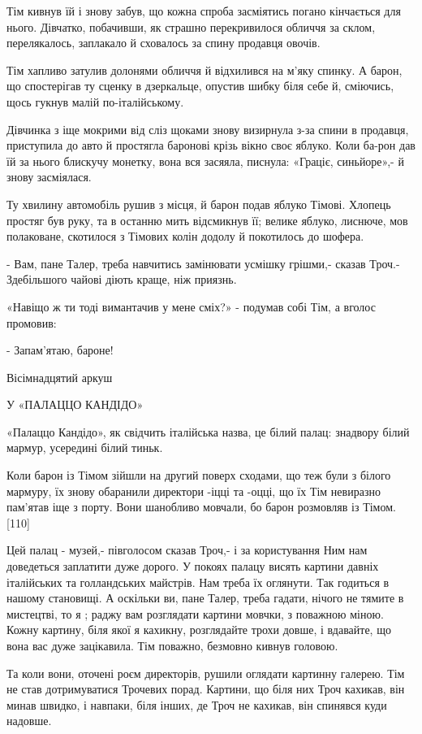 Тім кивнув їй і знову забув, що кожна спроба засміятись погано кінчається для нього. Дівчатко, побачивши, як страшно перекривилося обличчя за склом, перелякалось, заплакало й сховалось за спину продавця овочів.

Тім хапливо затулив долонями обличчя й відхилився на м'яку спинку. А барон, що спостерігав ту сценку в дзеркальце, опустив шибку біля себе й, сміючись, щось гукнув малій по-італійському.

Дівчинка з іще мокрими від сліз щоками знову визирнула з-за спини в продавця, приступила до авто й простягла баронові крізь вікно своє яблуко. Коли ба-рон дав їй за нього блискучу монетку, вона вся засяяла, писнула: «Граціє, синьйоре»,- й знову засміялася.

Ту хвилину автомобіль рушив з місця, й барон подав яблуко Тімові. Хлопець простяг був руку, та в останню мить відсмикнув її; велике яблуко, лиснюче, мов полаковане, скотилося з Тімових колін додолу й покотилось до шофера.

- Вам, пане Талер, треба навчитись замінювати усмішку грішми,- сказав Троч.- Здебільшого чайові діють краще, ніж приязнь.

«Навіщо ж ти тоді вимантачив у мене сміх?» - подумав собі Тім, а вголос промовив:

- Запам'ятаю, бароне!

Вісімнадцятий аркуш

У «ПАЛАЦЦО КАНДІДО»

«Палаццо Кандідо», як свідчить італійська назва, це білий палац: знадвору білий мармур, усередині білий тиньк.

Коли барон із Тімом зійшли на другий поверх сходами, що теж були з білого мармуру, їх знову обаранили директори -іцці та -оцці, що їх Тім невиразно пам'ятав іще з порту. Вони шанобливо мовчали, бо барон розмовляв із Тімом. [110]

Цей палац - музей,- півголосом сказав Троч,- і за користування Ним нам доведеться заплатити дуже дорого. У покоях палацу висять картини давніх італійських та голландських майстрів. Нам треба їх оглянути. Так годиться в нашому становищі. А оскільки ви, пане Талер, треба гадати, нічого не тямите в мистецтві, то я ; раджу вам розглядати картини мовчки, з поважною міною. Кожну картину, біля якої я кахикну, розглядайте трохи довше, і вдавайте, що вона вас дуже зацікавила. Тім поважно, безмовно кивнув головою.

Та коли вони, оточені роєм директорів, рушили оглядати картинну галерею. Тім не став дотримуватися Трочевих порад. Картини, що біля них Троч кахикав, він минав швидко, і навпаки, біля інших, де Троч не кахикав, він спинявся куди надовше.

